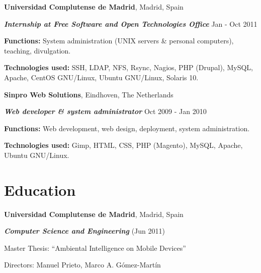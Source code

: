 \documentclass[margin,line]{resume}
\begin{document}
\begin{resume}
{\bf Universidad Complutense de Madrid}, Madrid, Spain

\vspace{-.2cm}
{\bf \em Internship at Free Software and Open Technologies Office} \hfill
{ Jan - Oct 2011
}
\begin{list2}
\vspace*{.06in}
\item {\bf Functions: }{System administration (UNIX servers \& personal 
computers), teaching, divulgation.}
\item {\bf Technologies used: }{SSH, LDAP, NFS, Rsync, Nagios, PHP
(Drupal), MySQL, Apache, CentOS GNU/Linux, Ubuntu GNU/Linux, Solaris 10.}
\end{list2}



{\bf Sinpro Web Solutions}, Eindhoven, The Netherlands

\vspace{-.2cm}
{\bf \em Web developer \& system administrator} \hfill { Oct 2009 -
Jan 2010}
\begin{list2}
\vspace*{.06in}
\item {\bf Functions: }{Web development, web design, deployment, 
system administration.}
\item {\bf Technologies used: }{Gimp, HTML, CSS, PHP (Magento), MySQL,
Apache, Ubuntu GNU/Linux.}
\end{list2}

\vspace{+.2in}
\section{\sc Education}
{\bf Universidad Complutense de Madrid}, Madrid, Spain\\
\vspace*{-.1in}
\begin{list1}
\item[] {\bf \em Computer Science and Engineering }(Jun 2011) 
\begin{list2}
\vspace*{.05in}
\item Master Thesis:  ``Ambiental Intelligence on Mobile Devices'' 
\item Directors:  Manuel Prieto, Marco A. Gómez-Martín
\end{list2}
\end{list1}



\end{resume}
\end{document}
